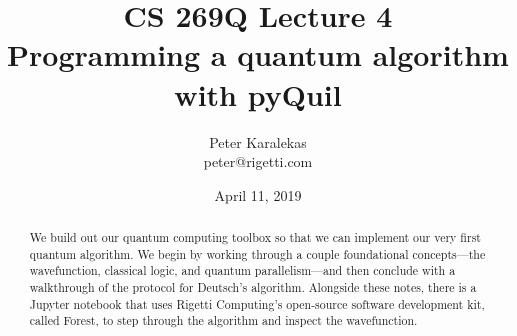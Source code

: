 \documentclass[12pt, letterpaper]{article}
\title{CS 269Q Lecture 4 \\ \large Programming a quantum algorithm with pyQuil\vspace{-1ex}}
\author{Peter Karalekas \\ \small peter@rigetti.com}
\date{\normalsize April 11, 2019\vspace{-3ex}}
\begin{document}
\maketitle

\begin{abstract}
\noindent
We build out our quantum computing toolbox so that we can implement our very first quantum algorithm. We begin by working through a couple foundational concepts—the wavefunction, classical logic, and quantum parallelism—and then conclude with a walkthrough of the protocol for Deutsch's algorithm. Alongside these notes, there is a Jupyter notebook that uses Rigetti Computing's open-source software development kit, called Forest, to step through the algorithm and inspect the wavefunction.
\end{abstract}


\def\w{\ar@{-}[l]}
\def\W{\ar@{=}[l]}


\def\A#1{\save []="#1" \restore}


\def\op#1{*+[F]{\rule[-0.2ex]{0ex}{2.1ex}#1}}	%
\def\b{*={\bullet}}
\def\o{*={\oplus}}
\def\t{*={\times}}				%
\def\sq{*=<6pt,6pt>[F]{}}			%
\def\m#1{\left[\matrix{#1}\right]}		%
\def\z{*+[]{\rule[-0.2ex]{0ex}{2.1ex}~|0\>}}	%
\def\discard{*[]{\rule[-0.2ex]{0.75pt}{2.1ex}~}}	%
\def\slash{*={/}}				%


\def\N{*-{}\W}
\def\n{*-{}\w}


\def\>{\rangle}
\def\<{\langle}
\def\ua{\uparrow}

\def\meter{*+[]{\put(-3,0){\texttt{[image: meter.epsf]}}~~~~}%
		\ar@{-}[l]}

\end{document}
